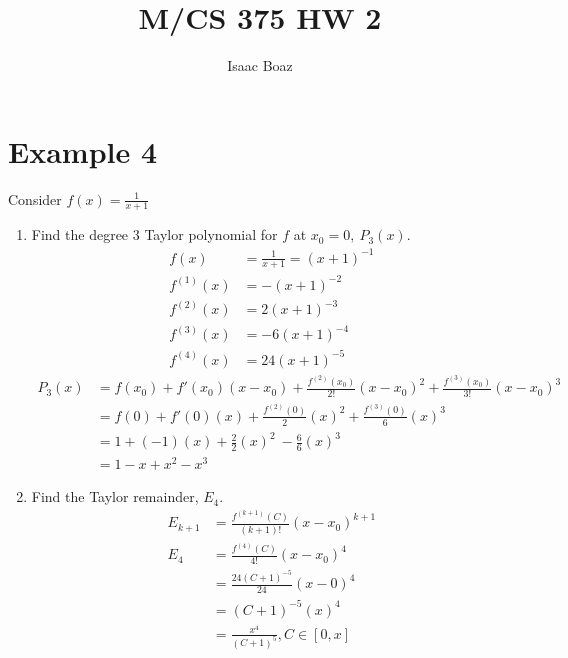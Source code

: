 \documentclass{article}
\title{\vspace{-5ex}M/CS 375 HW 2}
\author{Isaac Boaz}
\begin{document}
\maketitle

\section*{Example 4}
Consider \(f(x) = \frac{1}{x + 1}\)

\begin{enumerate}[label=(\alph*)]
    \item Find the degree 3 Taylor polynomial for \(f\) at \(x_0 = 0,\ P_3(x)\).
          \begin{align*}
              f(x)       & = \frac{1}{x + 1} = (x + 1)^{-1} \\
              f^{(1)}(x) & = -(x + 1)^{-2}                  \\
              f^{(2)}(x) & = 2(x + 1)^{-3}                  \\
              f^{(3)}(x) & = -6(x + 1)^{-4}                 \\
              f^{(4)}(x) & = 24(x + 1)^{-5}
          \end{align*}
          \begin{align*}
              P_3(x) & = f(x_0) + f'(x_0)(x - x_0) + \frac{f^{(2)}(x_0)}{2!}(x - x_0)^2 + \frac{f^{(3)}(x_0)}{3!}(x - x_0)^3 \\
                     & = f(0) + f'(0)(x) + \frac{f^{(2)}(0)}{2}(x)^2 + \frac{f^{(3)}(0)}{6}(x)^3                             \\
                     & = 1 + (-1)(x) + \frac{2}{2}(x)^2\ - \frac{6}{6}(x)^3                                                  \\
                     & = 1 - x + x^2 - x^3
          \end{align*}
    \item Find the Taylor remainder, \(E_4\).
          \begin{align*}
              E_{k+1} & = \frac{f^{(k+1)}(C)}{(k+1)!}(x - x_0)^{k+1} \\
              E_4     & = \frac{f^{(4)}(C)}{4!}(x - x_0)^4           \\
                      & = \frac{24(C + 1)^{-5}}{24}(x-0)^4           \\
                      & = (C+1)^{-5}(x)^4                            \\
                      & = \frac{x^4}{(C+1)^5}, C \in [0, x]
          \end{align*}

\end{enumerate}
\end{document}
